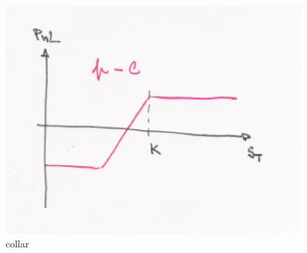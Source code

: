 \begin{itemize}
\begin{figure}[htp]
\includegraphics[scale = 0.75]{collar.eps}
\caption{collar}
\label{collar}
\end{figure}
\end{itemize}



